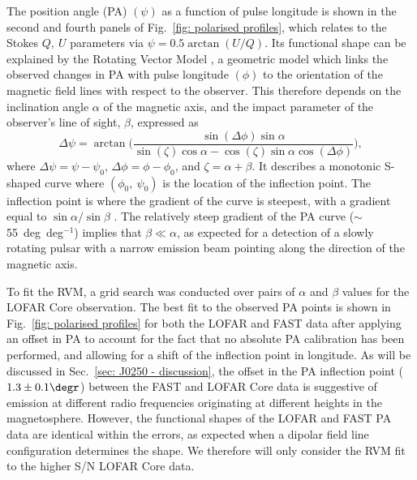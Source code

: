 The position angle (PA) $(\psi)$ as a function of pulse longitude is shown in the second and fourth panels of Fig.~\ref{fig: polarised profiles}, which relates to the Stokes $Q,\ U$ parameters via $\psi = 0.5 \arctan(U/Q)$. Its functional shape can be explained by the Rotating Vector Model \citep[RVM;][]{RCxx1969}, a geometric model which links the observed changes in PA with pulse longitude $(\phi)$ to the orientation of the magnetic field lines with respect to the observer. This therefore depends on the inclination angle $\alpha$ of the magnetic axis, and the impact parameter of the observer's line of sight, $\beta$, expressed as
\begin{equation}
    \label{eq: RVM}
    \Delta\psi = \arctan\bigg(  \frac{\sin(\Delta\phi) \sin\alpha }{\sin(\zeta)\cos\alpha - \cos(\zeta)\sin\alpha\cos(\Delta\phi) }  \bigg),
\end{equation}
where $\Delta\psi = \psi - \psi_0$, $\Delta\phi = \phi - \phi_0$, and $\zeta = \alpha + \beta$. It describes a monotonic S-shaped curve where $(\phi_0,\ \psi_0)$ is the location of the inflection point. The inflection point is where the gradient of the curve is steepest, with a gradient equal to $\sin\alpha/\sin\beta$ \citep{Kxxx1970}. The relatively steep gradient of the PA curve ($\sim$55~deg~deg$^{-1}$) implies that $\beta\ll\alpha$, as expected for a detection of a slowly rotating pulsar with a narrow emission beam pointing along the direction of the magnetic axis.

To fit the RVM, a grid search was conducted over pairs of $\alpha$ and $\beta$ values \citep[for details, see][]{RWJx2015a} for the LOFAR Core observation. The best fit to the observed PA points is shown in Fig.~\ref{fig: polarised profiles} for both the LOFAR and FAST data after applying an offset in PA to account for the fact that no absolute PA calibration has been performed, and allowing for a shift of the inflection point in longitude. As will be discussed in Sec.~\ref{sec: J0250 - discussion}, the offset in the PA inflection point ($1.3\pm0.1\degr$) between the FAST and LOFAR Core data is suggestive of emission at different radio frequencies originating at different heights in the magnetosphere. However, the functional shapes of the LOFAR and FAST PA data are identical within the errors, as expected when a dipolar field line configuration determines the shape. We therefore will only consider the RVM fit to the higher S/N LOFAR Core data.

